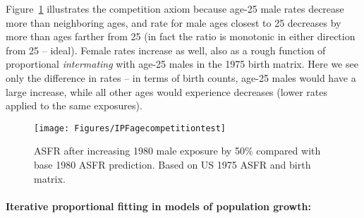 Figure~\ref{fig:IPFcomp} illustrates the competition axiom because age-25 male
rates decrease more than neighboring ages, and rate for male ages closest to 25
decreases by more than ages farther from 25 (in fact the ratio is monotonic in
either direction from 25 -- ideal). Female rates increase as well, also as a
rough function of proportional \textit{intermating} with age-25 males in the
1975 birth matrix. Here we see only the difference
in rates -- in terms of birth counts, age-25 males would have a large increase,
while all other ages would experience decreases (lower rates applied to the same exposures).

\begin{figure}[ht!]
        \centering  
          \caption{ASFR after increasing 1980 male exposure by 50\% compared
          with base 1980 ASFR prediction. Based on US 1975 ASFR and birth
          matrix.}
           \texttt{[image: Figures/IPFagecompetitiontest]}
          \label{fig:IPFcomp}
\end{figure}

\paragraph{Iterative proportional fitting in models of population growth: }

